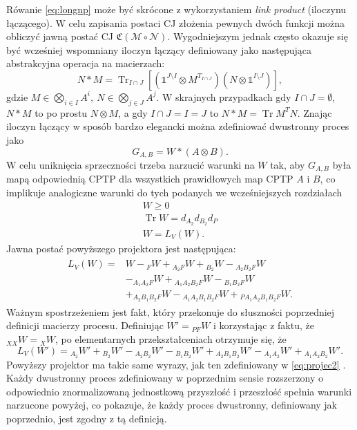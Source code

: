 \documentclass[10pt]{article} %
\DeclareMathOperator{\Trs}{Tr}
\newcommand{\I}{\mathbb{1}}
\newcommand{\MCJ}{\mathfrak{C}}
\begin{document}
Rówanie \eqref{eq:longnp} może być skrócone z wykorzystaniem \textit{link product} (iloczynu łączącego).
W celu zapisania postaci CJ złożenia pewnych dwóch funkcji można obliczyć jawną postać CJ $\MCJ(\mathcal{M} \circ \mathcal{N})$. Wygodniejszym
jednak często okazuje się być wcześniej wspomniany iloczyn łączący definiowany jako następująca abstrakcyjna operacja na macierzach:
\begin{equation}
N * M = \Trs_{I\cap J}\left[ (\I^{J\setminus I} \otimes M^{T_{I\cap J}})(N \otimes \I^{I\setminus J})\right],
\end{equation}
gdzie $M \in \bigotimes_{i \in I} A^i,~N \in \bigotimes_{j \in J} A^j$. W skrajnych przypadkach gdy $I \cap J = \emptyset$, $N*M$ to po prostu $N \otimes M$, a
gdy $I \cap J = I = J$ to $N * M = \Trs M^T N$.
Znając iloczyn łączący w sposób bardzo elegancki można zdefiniować dwustronny proces jako
\begin{equation}
G_{A,B} = W * (A \otimes B).
\end{equation}
W celu uniknięcia sprzeczności trzeba narzucić warunki na $W$ tak, aby $G_{A,B}$ była mapą odpowiednią CPTP dla wszystkich prawidłowych map CPTP $A$ i $B$, co implikuje analogiczne warunki do tych podanych we wcześniejszych rozdziałach
\begin{gather}
W \geq 0 \\
\Trs W = d_{A_2}d_{B_2}d_P \\
W = L_V(W).
\end{gather} 
Jawna postać powyższego projektora jest następująca:
\begin{align}
\begin{split}
L_V(W) =& W -{}_FW + {}_{A_2F}W + {}_{B_2}W - {}_{A_2B_2F}W\\ &- {}_{A_1A_2F}W + {}_{A_1A_2B_2F}W - {}_{B_1B_2F}W \\&+ {}_{A_2B_1B_2F}W - {}_{A_1A_2B_1B_2F}W + {}_{PA_1A_2B_1B_2F}W.
\end{split}
\end{align}
Ważnym spostrzeżeniem jest fakt, który przekonuje do słuszności poprzedniej definicji macierzy procesu. Definiując $W' = {}_{PF}W$ i korzystając z faktu, że
${}_{XX}W = {}_{X}W$, po elementarnych przekształceniach otrzymuje się, że
\begin{equation}
L_V(W') = {}_{A_2}W' + {}_{B_2}W' - {}_{A_2B_2}W' - {}_{B_1B_2}W' + {}_{A_2B_1B_2}W' - {}_{A_1A_2}W' + {}_{A_1A_2B_2}W'.
\end{equation}
Powyższy projektor ma takie same wyrazy, jak ten zdefiniowany w \eqref{eq:projec2} .
Każdy dwustronny proces zdefiniowany w poprzednim sensie rozszerzony o odpowiednio znormalizowaną jednostkową przyszłość i przeszłość spełnia warunki narzucone powyżej, co pokazuje, że każdy proces dwustronny, definiowany jak poprzednio, jest zgodny z tą definicją.
\end{document}
